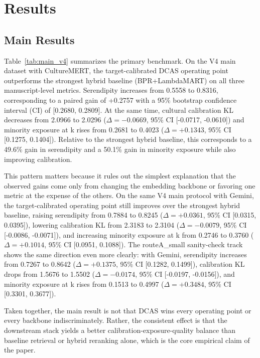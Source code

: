 \section{Results}
\label{sec:results}

\subsection{Main Results}

Table~\ref{tab:main_v4} summarizes the primary benchmark. On the V4 main dataset with CultureMERT, the target-calibrated DCAS operating point outperforms the strongest hybrid baseline (BPR+LambdaMART) on all three manuscript-level metrics. Serendipity increases from 0.5558 to 0.8316, corresponding to a paired gain of +0.2757 with a 95\% bootstrap confidence interval (CI) of [0.2680, 0.2809]. At the same time, cultural calibration KL decreases from 2.0966 to 2.0296 ($\Delta=-0.0669$, 95\% CI [-0.0717, -0.0610]) and minority exposure at k rises from 0.2681 to 0.4023 ($\Delta=+0.1343$, 95\% CI [0.1275, 0.1404]). Relative to the strongest hybrid baseline, this corresponds to a 49.6\% gain in serendipity and a 50.1\% gain in minority exposure while also improving calibration.

This pattern matters because it rules out the simplest explanation that the observed gains come only from changing the embedding backbone or favoring one metric at the expense of the others. On the same V4 main protocol with Gemini, the target-calibrated operating point still improves over the strongest hybrid baseline, raising serendipity from 0.7884 to 0.8245 ($\Delta=+0.0361$, 95\% CI [0.0315, 0.0395]), lowering calibration KL from 2.3183 to 2.3104 ($\Delta=-0.0079$, 95\% CI [-0.0086, -0.0071]), and increasing minority exposure at k from 0.2746 to 0.3760 ($\Delta=+0.1014$, 95\% CI [0.0951, 0.1088]). The routeA_small sanity-check track shows the same direction even more clearly: with Gemini, serendipity increases from 0.7267 to 0.8642 ($\Delta=+0.1375$, 95\% CI [0.1282, 0.1499]), calibration KL drops from 1.5676 to 1.5502 ($\Delta=-0.0174$, 95\% CI [-0.0197, -0.0156]), and minority exposure at k rises from 0.1513 to 0.4997 ($\Delta=+0.3484$, 95\% CI [0.3301, 0.3677]).

Taken together, the main result is not that DCAS wins every operating point or every backbone indiscriminately. Rather, the consistent effect is that the downstream stack yields a better calibration-exposure-quality balance than baseline retrieval or hybrid reranking alone, which is the core empirical claim of the paper.

